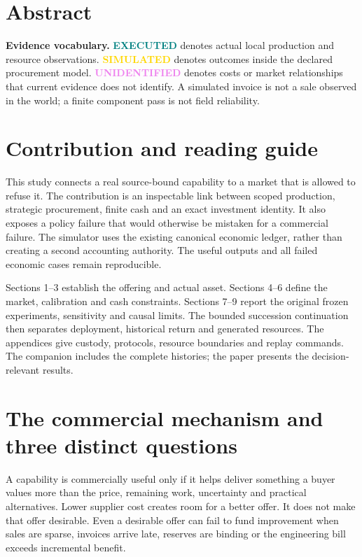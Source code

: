 \documentclass[11pt,a4paper]{article}
\newcommand{\measured}{\textcolor{Teal}{\textbf{EXECUTED}}}
\newcommand{\simulated}{\textcolor{Gold}{\textbf{SIMULATED}}}
\newcommand{\unknown}{\textcolor{Violet}{\textbf{UNIDENTIFIED}}}
\begin{document}
\section*{Abstract}


\begin{boundarybox}
\textbf{Evidence vocabulary.} \measured{} denotes actual local production and resource observations.
\simulated{} denotes outcomes inside the declared procurement model.
\unknown{} denotes costs or market relationships that current evidence does not identify.
A simulated invoice is not a sale observed in the world; a finite component pass is not field reliability.
\end{boundarybox}

\section*{Contribution and reading guide}
This study connects a real source-bound capability to a market that is allowed to refuse it.
The contribution is an inspectable link between scoped production, strategic procurement,
finite cash and an exact investment identity. It also exposes a policy failure that would otherwise
be mistaken for a commercial failure. The simulator uses the existing canonical economic ledger,
rather than creating a second accounting authority. The useful outputs and all failed economic
cases remain reproducible.

Sections 1--3 establish the offering and actual asset. Sections 4--6 define the market, calibration
and cash constraints. Sections 7--9 report the original frozen experiments, sensitivity and causal limits.
The bounded succession continuation then separates deployment, historical return and generated resources.
The appendices give custody, protocols, resource boundaries and replay commands.
The companion includes the complete histories; the paper presents the decision-relevant results.

\setcounter{tocdepth}{1}\tableofcontents
\newpage

\section{The commercial mechanism and three distinct questions}
A capability is commercially useful only if it helps deliver something a buyer values more than
the price, remaining work, uncertainty and practical alternatives. Lower supplier cost creates room
for a better offer. It does not make that offer desirable. Even a desirable offer can fail to fund
improvement when sales are sparse, invoices arrive late, reserves are binding or the engineering
bill exceeds incremental benefit.
\end{document}
